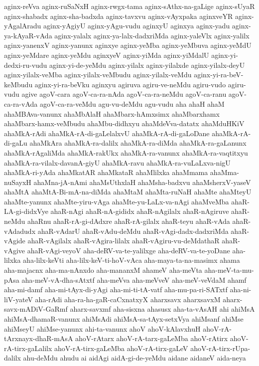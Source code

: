 {aginx-reVva
aginx-ruSaNxH
aginx-rwgx-tama
aginx-sAthx-na-gaLige
aginx-sUyaR
aginx-shabadx
aginx-sha-badxda
aginx-tavxvu
aginx-vAyxpaka
aginxveYR
aginx-yAgalAradu
aginx-yAgiyU
aginx-yAgu-vudu
aginxyU
aginxya
aginx-yadu
aginx-ya-kAyaR-vAda
aginx-yalalx
aginx-ya-lalx-dadxriMda
aginx-yaleVlx
aginx-yalilx
aginx-yanenxV
aginx-yanunx
aginxye
aginx-yeMba
aginx-yeMbuva
aginx-yeMdU
aginx-yeMdare
aginx-yeMdu
aginxyeV
aginx-yiMda
aginx-yiMdalU
aginx-yi-dedxi-ru-vudu
aginx-yi-de-yeMdu
aginx-yilalx
aginx-yilalxde
aginx-yilalx-deyU
aginx-yilalx-veMba
aginx-yilalx-veMbudu
aginx-yilalx-veMdu
aginx-yi-ra-beV-keMbudu
aginx-yi-ra-beVku
aginxyu
agiruva
agiru-ve-neMdu
agiru-vudo
agiru-vudu
agive
agoV-cara
agoV-ca-ra-nAda
agoV-ca-ra-neMdu
agoV-ca-ranu
agoV-ca-ra-vAda
agoV-ca-ra-veMdu
agu-vu-deMdu
agu-vudu
aha
ahaH
ahaM
ahaMBAva-vanunx
ahaMbAlaH
ahaMbarx-hAmxsimx
ahaMbarxhamx
ahaMbarx-hamx-veMbudu
ahaMbu-didhxyu
ahaMdeVva-datatx
ahaMduHKiV
ahaMkA-rAdi
ahaMkA-rA-di-gaLelalxvU
ahaMkA-rA-di-gaLoDane
ahaMkA-rA-di-gaLu
ahaMkAra
ahaMkA-ra-dalilx
ahaMkA-ra-diMda
ahaMkA-ra-gaLanunx
ahaMkA-rAgaliMda
ahaMkA-rakUkx
ahaMkA-ra-vanunx
ahaMkA-ra-vaqtitxyu
ahaMkA-ra-vilalx-davanA-giyU
ahaMkA-ravu
ahaMkA-ra-vuLaLxva-nigU
ahaMkA-ri-yAda
ahaMkatAR
ahaMkataR
ahaMlilxka
ahaMmama
ahaMma-nuSayxH
ahaMna-jA-nAmi
ahaMsUthxlaH
ahaMsha-badxvu
ahaMsherxV-yaseV
ahaMtA
ahaMtA-Bi-mA-na-diMda
ahaMtaM
ahaMta-ruNaH
ahaMte
ahaMteyU
ahaMte-yanunx
ahaMte-yiru-vAga
ahaMte-yu-LaLx-va-nAgi
ahaMveMba
ahaR-LA-gi-didxVye
ahaR-nAgi
ahaR-nA-gididx
ahaR-nAgilalx
ahaR-nAgiruve
ahaR-neMdu
ahaRnu
ahaR-rA-gi-dAdxre
ahaR-rA-gilalx
ahaR-teyu
ahaR-vAda
ahaR-vAdadudx
ahaR-vAdarU
ahaR-vAdu-deMdu
ahaR-vAgi-dadx-dadxriMda
ahaR-vAgide
ahaR-vAgilalx
ahaR-vAgira-lilalx
ahaR-vAgiru-vu-deMdathaR
ahaR-vAgive
ahaR-vAgi-veyoV
aha-deRV-va-te-yalilxge
aha-deRV-va-te-yoDane
aha-lilxka
aha-lilx-keVti
aha-lilx-keV-ti-hoV-vAca
aha-maya-ta-na-masimx
ahama
aha-majacnx
aha-ma-nAnxdo
aha-mananxM
ahameV
aha-meVta
aha-meV-ta-mu-pAsa
aha-meV-vA-dha-sAtxtf
aha-meVva
aha-meVveV
aha-meV-veVdaM
ahamf
aha-mi-damf
aha-mi-tAyx-di-yAgi
aha-mi-ti-tA-vatf
aha-mu-pa-ri-SATxtf
aha-ni-liV-yateV
aha-rAdi
aha-ra-ha-gaR-caCxnatxyX
aharxsavx
aharxsavxM
aharx-savx-mADiV-GaRmf
aharx-savxmf
aha-sisxna
ahasusx
aha-ta-vAsAH
ahi
ahiMsA
ahiMsA-dhamaR-vanunx
ahiMsAdi
ahiMsA-sa-tAyx-setxVya
ahiMsanf
ahiMse
ahiMseyU
ahiMse-yanunx
ahi-ta-vanunx
ahoV
ahoV-kAlavxhuH
ahoV-rA-tArxnayx-dhaR-mAsA
ahoV-rAtarx
ahoV-rA-tarx-gaLeMba
ahoV-rAtirx
ahoV-rA-tirx-gaLalilx
ahoV-rA-tirx-gaLeMba
ahoV-rA-tirx-gaLeV
ahoV-rA-tirx-rUpa-dalilx
ahu-deMdu
ahudu
ai
aidAgi
aidA-gi-de-yeMdu
aidane
aidaneV
aida-neya
}
